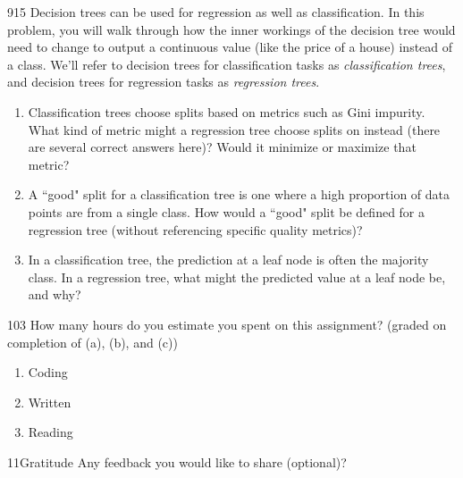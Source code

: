 \documentclass[11pt]{article}
\begin{document}
\newpage



\begin{problem}{9}{15}
Decision trees can be used for regression as well as classification. In this problem, you will walk through how the inner workings of the decision tree would need to change to output a continuous value (like the price of a house) instead of a class. We'll refer to decision trees for classification tasks as \textit{classification trees}, and decision trees for regression tasks as \textit{regression trees}. 
\begin{enumerate}[label=(\alph*)]
\item Classification trees choose splits based on metrics such as Gini impurity. What kind of metric might a regression tree choose splits on instead (there are several correct answers here)? Would it minimize or maximize that metric? 
\item A ``good" split for a classification tree is one where a high proportion of data points are from a single class. How would a ``good" split be defined for a regression tree (without referencing specific quality metrics)?
\item In a classification tree, the prediction at a leaf node is often the majority class. In a regression tree, what might the predicted value at a leaf node be, and why?
\end{enumerate}


\end{problem}

\begin{studentanswer}[30]
\end{studentanswer}

\begin{problem}{10}{3}
How many hours do you estimate you spent on this assignment? (graded on completion of (a), (b), and (c))
\begin{enumerate}[label=(\alph*)]
    \item Coding \\
    \item Written \\
    \item Reading \\
\end{enumerate}
\end{problem}

\begin{studentanswer}[6]
\end{studentanswer}

\begin{problem}{11}{Gratitude}
Any feedback you would like to share (optional)?
\end{problem}

\begin{studentanswer}[4]
\end{studentanswer}
\end{document}

